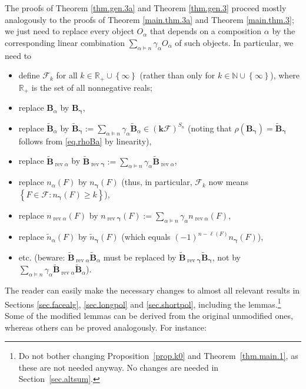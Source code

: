 \documentclass[12pt]{article}
\theoremstyle{definition}%
\theoremstyle{definition}%
\theoremstyle{remark}%
\newcommand{\tup}[1]{\left( #1 \right)}
\newcommand{\set}[1]{\left\{ #1 \right\}}
\newcommand{\NN}{\mathbb{N}}
\newcommand{\RR}{\mathbb{R}}
\newcommand{\kk}{\mathbf{k}}
\newcommand{\kf}{\kk\mathcal{F}}
\newcommand{\kfsn}{\left(\kf\right)^{S_n}}
\newcommand{\BB}{\mathbf{B}}
\newcommand{\BBa}{\mathbf{B}_{\alpha}}
\newcommand{\BBt}{\widetilde{\mathbf{B}}}
\newcommand{\BBta}{\widetilde{\mathbf{B}}_{\alpha}}
\newcommand{\CF}{\mathcal{F}}
\newcommand{\bgamma}{\bm{\gamma}}
\newcommand{\na}{n_{ \alpha } }%
\newcommand{\nn}{\widetilde{n}}%
\newcommand{\nna}{\widetilde{n}_{ \alpha } }%
\newcommand{\rev}{\operatorname{rev}}
\begin{document}
The proofs of Theorem \ref{thm.gen.3a} and Theorem \ref{thm.gen.3} proceed mostly analogously to the proofs of Theorem \ref{main.thm.3a} and Theorem \ref{main.thm.3};
we just need to replace every object $O_\alpha$ that depends on a composition $\alpha$ by the corresponding linear combination $\sum_{\alpha \models n} \gamma_\alpha O_\alpha$ of such objects.
In particular, we need to
\begin{itemize}
\item define $\CF_k$ for all $k \in \RR_+\cup\set{\infty}$ (rather than only for $k \in \NN\cup\set{\infty}$), where $\RR_+$ is the set of all nonnegative reals;
\item replace $\BBa$ by $\BB_{\bgamma}$,
\item replace $\BBta$ by $\BBt_{\bgamma} := \sum_{\alpha \models n} \gamma_\alpha \BBta \in \kfsn$ (noting that $\rho\tup{\BB_{\bgamma}} = \BBt_{\bgamma}$ follows from \eqref{eq.rhoBa} by linearity),
\item replace $\BBt_{\rev \alpha}$ by $\BBt_{\rev \bgamma} := \sum_{\alpha \models n} \gamma_\alpha \BBt_{\rev \alpha}$,
\item replace $\na\tup{F}$ by $n_{\bgamma}\tup{F}$ (thus, in particular, $\CF_k$ now means $\set{F \in \CF : n_{\bgamma}\tup{F} \geq k }$),
\item replace $n_{\rev \alpha}\tup{F}$ by $n_{\rev \bgamma}\tup{F} := \sum_{\alpha \models n} \gamma_\alpha n_{\rev \alpha}\tup{F}$,
\item replace $\nna\tup{F}$ by $\nn_{\bgamma}\tup{F}$ (which equals $\tup{-1}^{n-\ell\tup{F}} n_{\bgamma}\tup{F}$),
\item etc. (beware: $\BBt_{\rev \alpha} \BBta$ must be replaced by $\BBt_{\rev \bgamma} \BBt_{\bgamma}$, not by $\sum_{\alpha \models n} \gamma_\alpha \BBt_{\rev \alpha} \BBta$).
\end{itemize}
The reader can easily make the necessary changes to almost all relevant results in Sections \ref{sec.facealg}, \ref{sec.longpol} and \ref{sec.shortpol}, including the lemmas.\footnote{Do not bother changing Proposition~\ref{prop.k0} and Theorem~\ref{thm.main.1}, as these are not needed anyway. No changes are needed in Section~\ref{sec.altsum}.}
Some of the modified lemmas can be derived from the original unmodified ones, whereas others can be proved analogously.
For instance:
\end{document}
